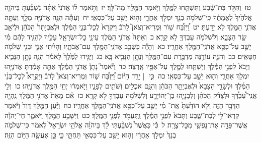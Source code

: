\documentclass[18pt]{article}
\newcommand{\kri}[1]{\Afootnote{#1}}	%
\begin{document}
 {\loc טז~}וַתִּקֹּ֣ד בַּת־שֶׁ֔בַע וַתִּשְׁתַּ֖חוּ לַמֶּ֑לֶךְ וַיֹּ֥אמֶר הַמֶּ֖לֶךְ מַה־לָּֽךְ׃ \startlock
 {\loc יז~}וַתֹּ֣אמֶר ל֗וֹ אֲדֹנִי֙ אַתָּ֨ה נִשְׁבַּ֜עְתָּ בַּיהֹוָ֤ה אֱלֹהֶ֙יךָ֙ לַאֲמָתֶ֔ךָ כִּֽי־שְׁלֹמֹ֥ה בְנֵ֖ךְ יִמְלֹ֣ךְ אַחֲרָ֑י וְה֖וּא יֵשֵׁ֥ב עַל־כִּסְאִֽי׃ \startlock
 {\loc יח~}וְעַתָּ֕ה הִנֵּ֥ה אֲדֹנִיָּ֖ה מָלָ֑ךְ וְעַתָּ֛ה אֲדֹנִ֥י הַמֶּ֖לֶךְ לֹ֥א יָדָֽעְתָּ׃ \startlock
 {\loc יט~}וַ֠יִּזְבַּ֠ח שׁ֥וֹר וּֽמְרִיא־וְצֹאן֮ לָרֹב֒ \edtext{{פ}
}{\kri{פסקא באמצע פסוק}מלכים א א יט} וַיִּקְרָא֙ לְכׇל־בְּנֵ֣י הַמֶּ֔לֶךְ וּלְאֶבְיָתָר֙ הַכֹּהֵ֔ן וּלְיֹאָ֖ב שַׂ֣ר הַצָּבָ֑א וְלִשְׁלֹמֹ֥ה עַבְדְּךָ֖ לֹ֥א קָרָֽא׃ \startlock
 {\loc כ~}וְאַתָּה֙ אֲדֹנִ֣י הַמֶּ֔לֶךְ עֵינֵ֥י כׇל־יִשְׂרָאֵ֖ל עָלֶ֑יךָ לְהַגִּ֣יד לָהֶ֔ם מִ֗י יֵשֵׁ֛ב עַל־כִּסֵּ֥א אֲדֹנִֽי־הַמֶּ֖לֶךְ אַחֲרָֽיו׃ \startlock
 {\loc כא~}וְהָיָ֕ה כִּשְׁכַ֥ב אֲדֹנִֽי־הַמֶּ֖לֶךְ עִם־אֲבֹתָ֑יו וְהָיִ֗יתִי אֲנִ֛י וּבְנִ֥י שְׁלֹמֹ֖ה חַטָּאִֽים׃ \startlock
 {\loc כב~}וְהִנֵּ֛ה עוֹדֶ֥נָּה מְדַבֶּ֖רֶת עִם־הַמֶּ֑לֶךְ וְנָתָ֥ן הַנָּבִ֖יא בָּֽא׃ \startlock
 {\loc כג~}וַיַּגִּ֤ידוּ לַמֶּ֙לֶךְ֙ לֵאמֹ֔ר הִנֵּ֖ה נָתָ֣ן הַנָּבִ֑יא וַיָּבֹא֙ לִפְנֵ֣י הַמֶּ֔לֶךְ וַיִּשְׁתַּ֧חוּ לַמֶּ֛לֶךְ עַל־אַפָּ֖יו אָֽרְצָה׃ \startlock
 {\loc כד~}וַיֹּ֘אמֶר֮ נָתָן֒ אֲדֹנִ֣י הַמֶּ֔לֶךְ אַתָּ֣ה אָמַ֔רְתָּ אֲדֹנִיָּ֖הוּ יִמְלֹ֣ךְ אַחֲרָ֑י וְה֖וּא יֵשֵׁ֥ב עַל־כִּסְאִֽי׃ \startlock
 {\loc כה~}כִּ֣י  |  יָרַ֣ד הַיּ֗וֹם וַ֠יִּזְבַּ֠ח שׁ֥וֹר וּֽמְרִיא־וְצֹאן֮ לָרֹב֒ וַיִּקְרָא֩ לְכׇל־בְּנֵ֨י הַמֶּ֜לֶךְ וּלְשָׂרֵ֤י הַצָּבָא֙ וּלְאֶבְיָתָ֣ר הַכֹּהֵ֔ן וְהִנָּ֛ם אֹכְלִ֥ים וְשֹׁתִ֖ים לְפָנָ֑יו וַיֹּ֣אמְר֔וּ יְחִ֖י הַמֶּ֥לֶךְ אֲדֹנִיָּֽהוּ׃ \startlock
 {\loc כו~}וְלִ֣י אֲנִֽי־עַ֠בְדֶּ֠ךָ וּלְצָדֹ֨ק הַכֹּהֵ֜ן וְלִבְנָיָ֧הוּ בֶן־יְהוֹיָדָ֛ע וְלִשְׁלֹמֹ֥ה עַבְדְּךָ֖ לֹ֥א קָרָֽא׃ \startlock
 {\loc כז~}אִ֗ם מֵאֵת֙ אֲדֹנִ֣י הַמֶּ֔לֶךְ נִֽהְיָ֖ה הַדָּבָ֣ר הַזֶּ֑ה וְלֹ֤א הוֹדַ֙עְתָּ֙ אֶֽת־ \edtext{(עבדיך)}{\kri{קרי: עַבְדְּךָ֔}}  מִ֗י יֵשֵׁ֛ב עַל־כִּסֵּ֥א אֲדֹנִֽי־הַמֶּ֖לֶךְ אַחֲרָֽיו׃ \startlock
 {\loc כח~}וַיַּ֨עַן הַמֶּ֤לֶךְ דָּוִד֙ וַיֹּ֔אמֶר קִרְאוּ־לִ֖י לְבַת־שָׁ֑בַע וַתָּבֹא֙ לִפְנֵ֣י הַמֶּ֔לֶךְ וַֽתַּעֲמֹ֖ד לִפְנֵ֥י הַמֶּֽלֶךְ׃ \startlock
 {\loc כט~}וַיִּשָּׁבַ֥ע הַמֶּ֖לֶךְ וַיֹּאמַ֑ר חַי־יְהֹוָ֕ה אֲשֶׁר־פָּדָ֥ה אֶת־נַפְשִׁ֖י מִכׇּל־צָרָֽה׃ \startlock
 {\loc ל~}כִּ֡י כַּאֲשֶׁר֩ נִשְׁבַּ֨עְתִּי לָ֜ךְ בַּיהֹוָ֨ה אֱלֹהֵ֤י יִשְׂרָאֵל֙ לֵאמֹ֔ר כִּֽי־שְׁלֹמֹ֤ה בְנֵךְ֙ יִמְלֹ֣ךְ אַחֲרַ֔י וְה֛וּא יֵשֵׁ֥ב עַל־כִּסְאִ֖י תַּחְתָּ֑י כִּ֛י כֵּ֥ן אֶעֱשֶׂ֖ה הַיּ֥וֹם הַזֶּֽה׃ \startlock
\end{document}
